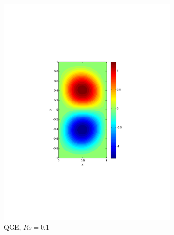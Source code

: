 \begin{figure}
\begin{center}
\begin{subfigure}{0.3\textwidth}
    \includegraphics[scale=0.5]{Figures/Re200Ro1E-1h16k1000}
    \caption{QGE, $Ro=0.1$}
    \label{sfi:QGERo0.1}
  \end{subfigure}
  \begin{subfigure}{0.3\textwidth}
    \vspace{1.3em}
    \centering

\end{subfigure}
\end{center}
\end{figure}
